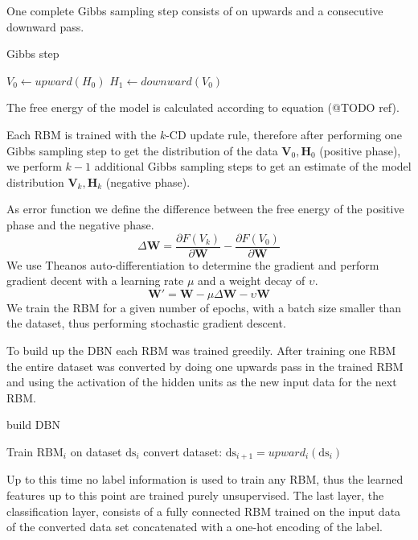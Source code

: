 One complete Gibbs sampling step consists of on upwards and a consecutive downward pass.

\begin{algorithm}
\caption{Gibbs step}
\begin{algorithmic}
\State $V_0 \gets upward(H_0) $  
\State $H_1 \gets downward(V_0) $  
\end{algorithmic}
\end{algorithm}

The free energy of the model is calculated according to equation (@TODO ref).

Each RBM is trained with the $k$-CD update rule, therefore after performing one Gibbs sampling step to get the distribution of the data $\textbf{V}_0, \textbf{H}_0$  (positive phase), we perform $k-1$ additional Gibbs sampling steps to get an estimate of the model distribution $\textbf{V}_k, \textbf{H}_k$  (negative phase).

As error function we define the difference between the free energy of the positive phase and the negative phase.
\[
\Delta \textbf{W} = \frac{\partial F(V_k)}{\partial \textbf{W}} -  \frac{\partial F(V_0)}{\partial \textbf{W}} 
\]
We use Theanos auto-differentiation to determine the gradient and perform gradient decent with a learning rate $\mu$ and a weight decay of $\upsilon$.
\[
\textbf{W}' = \textbf{W} - \mu \Delta \textbf{W} - \upsilon \textbf{W} 
\]
We train the RBM for a given number of epochs, with a batch size smaller than the dataset, thus performing stochastic gradient descent.

To build up the DBN each RBM was trained greedily.
After training one RBM the entire dataset was converted by doing one upwards pass in the trained RBM and using the activation of the hidden units as the new input data for the next RBM.

\begin{algorithm}
\caption{build DBN}
\begin{algorithmic}
\State Train $\text{RBM}_i$ on dataset $\text{ds}_i$
\State convert dataset: $\text{ds}_{i+1} = upward_i(\text{ds}_i)$ 
\EndFor
\end{algorithmic}
\end{algorithm}

Up to this time no label information is used to train any RBM, thus the learned features up to this point are trained purely unsupervised.
The last layer, the classification layer, consists of a fully connected RBM trained on the input data of the converted data set concatenated with a one-hot encoding of the label.



